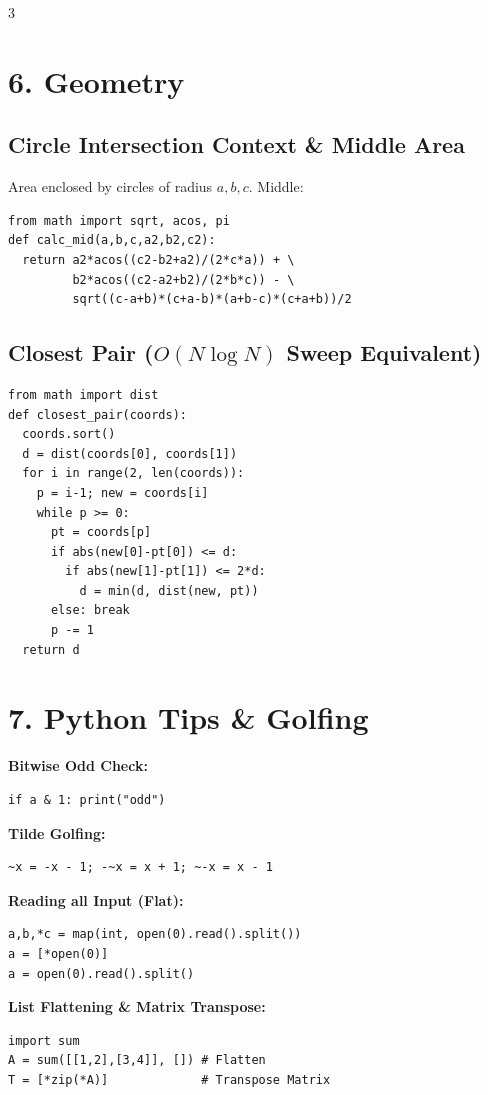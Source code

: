 \documentclass[8pt,a4paper,landscape]{extarticle}
\begin{document}
\begin{multicols*}{3}
\section*{6. Geometry}
\subsection*{Circle Intersection Context \& Middle Area}
Area enclosed by circles of radius $a, b, c$. Middle:
\begin{lstlisting}
from math import sqrt, acos, pi
def calc_mid(a,b,c,a2,b2,c2):
  return a2*acos((c2-b2+a2)/(2*c*a)) + \
         b2*acos((c2-a2+b2)/(2*b*c)) - \
         sqrt((c-a+b)*(c+a-b)*(a+b-c)*(c+a+b))/2
\end{lstlisting}

\subsection*{Closest Pair ($O(N \log N)$ Sweep Equivalent)}
\begin{lstlisting}
from math import dist
def closest_pair(coords):
  coords.sort()
  d = dist(coords[0], coords[1])
  for i in range(2, len(coords)):
    p = i-1; new = coords[i]
    while p >= 0:
      pt = coords[p]
      if abs(new[0]-pt[0]) <= d:
        if abs(new[1]-pt[1]) <= 2*d:
          d = min(d, dist(new, pt))
      else: break
      p -= 1
  return d
\end{lstlisting}

\section*{7. Python Tips \& Golfing}

\textbf{Bitwise Odd Check:}
\begin{lstlisting}
if a & 1: print("odd")
\end{lstlisting}

\textbf{Tilde Golfing:}
\begin{lstlisting}
~x = -x - 1; -~x = x + 1; ~-x = x - 1
\end{lstlisting}

\textbf{Reading all Input (Flat):}
\begin{lstlisting}
a,b,*c = map(int, open(0).read().split())
a = [*open(0)]
a = open(0).read().split()
\end{lstlisting}

\textbf{List Flattening \& Matrix Transpose:}
\begin{lstlisting}
import sum
A = sum([[1,2],[3,4]], []) # Flatten
T = [*zip(*A)]             # Transpose Matrix
\end{lstlisting}


\end{multicols*}
\end{document}
